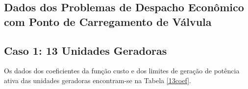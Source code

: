 \documentclass[
	12pt,				%
	openany,			%
	twoside,			%
	a4paper,			%
	chapter=TITLE,		%
	section=Title,		%
	subsection=Title,	%
	subsubsection=Title,%
	english,			%
	french,				%
	spanish,			%
	brazil			%
	]{abntex2}
\begin{document}
\begin{ERRATA}
%
%


\begin{apendicesenv}

\partapendices

\chapter{Dados dos Problemas de Despacho Econômico com Ponto de Carregamento de Válvula}


\section{Caso 1: 13 Unidades Geradoras}

Os dados dos coeficientes da função custo e dos limites de geração de potência ativa das unidades geradoras encontram-se na Tabela \ref{13coef}.


\end{apendicesenv}
\end{ERRATA}
\end{document}
